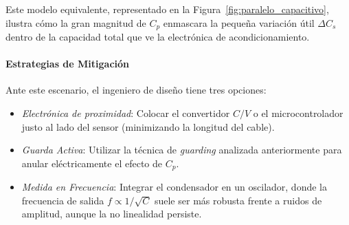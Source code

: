 Este modelo equivalente, representado en la Figura~\ref{fig:paralelo_capacitivo}, ilustra cómo la gran magnitud de $C_p$ enmascara la pequeña variación útil $\Delta C_s$ dentro de la capacidad total que ve la electrónica de acondicionamiento.


\begin{marginfigure}
    \centering
    \shorthandoff{>}
    \caption[Modelo equivalente del sensor y el cable.]{Modelo equivalente del sensor y el cable. La gran magnitud de $C_p$ enmascara los pequeños cambios de $C_s$.}\label{fig:paralelo_capacitivo}
\end{marginfigure}

\paragraph{Estrategias de Mitigación}
Ante este escenario, el ingeniero de diseño tiene tres opciones:
\begin{itemize}
    \item \emph{Electrónica de proximidad}: Colocar el convertidor $C/V$ o el microcontrolador justo al lado del sensor (minimizando la longitud del cable).
    \item \emph{Guarda Activa}: Utilizar la técnica de \textit{guarding} analizada anteriormente para anular eléctricamente el efecto de $C_p$.
    \item \emph{Medida en Frecuencia}: Integrar el condensador en un oscilador, donde la frecuencia de salida $f \propto 1/\sqrt{C}$ suele ser más robusta frente a ruidos de amplitud, aunque la no linealidad persiste.
\end{itemize}



